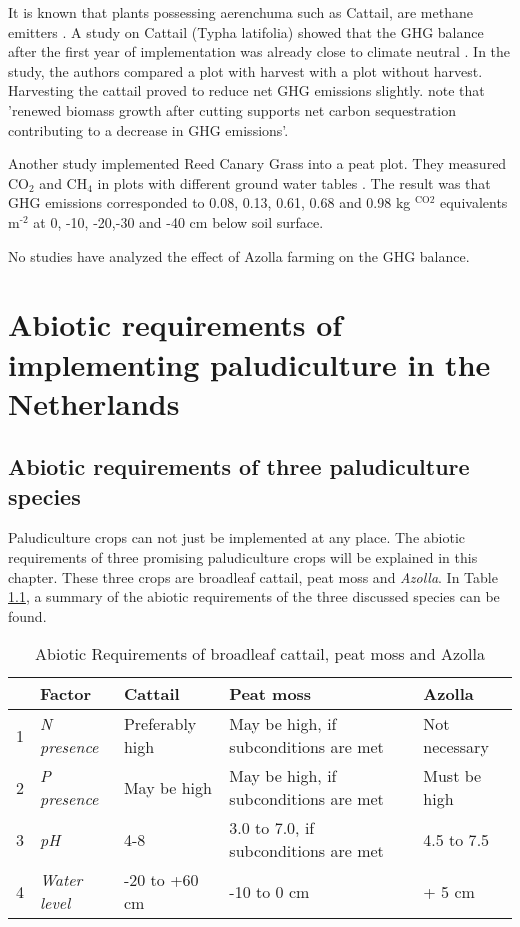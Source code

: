 \documentclass[a4paper,12pt]{scrbook}
\newcommand{\sur}[1]{\ensuremath{^{\textrm{#1}}}}
\newcommand{\sous}[1]{\ensuremath{_{\textrm{#1}}}}
\begin{document}
It is known that plants possessing aerenchuma such as Cattail, are methane emitters \citep{wichtmann2016paludiculture}. A study on Cattail (Typha latifolia) showed that the GHG balance after the first year of implementation was already close to climate neutral \citep{guntherghgtypha}. In the study, the authors compared a plot with harvest with a plot without harvest. Harvesting the cattail proved to reduce net GHG emissions slightly. \citet{wichtmann2016paludiculture} note that 'renewed biomass growth after cutting supports net carbon sequestration contributing to a decrease in GHG emissions'. 

Another study implemented Reed Canary Grass into a peat plot. They measured CO\sous{2} and CH\sous{4} in plots with different ground water tables \citep{Karki2014}. The result was that GHG emissions corresponded to 0.08, 0.13, 0.61, 0.68 and 0.98 kg \sur{CO2} equivalents m\sur{-2} at 0, -10, -20,-30 and -40 cm below soil surface.

No studies have analyzed the effect of Azolla farming on the GHG balance. 


\chapter{Abiotic requirements of implementing paludiculture in the Netherlands}

\section{Abiotic requirements of three paludiculture species}

Paludiculture crops can not just be implemented at any place. The abiotic requirements of three promising paludiculture crops will be explained in this chapter. These three crops are broadleaf cattail, peat moss and \textit{Azolla}. In Table \ref{tab:phy}, a summary of the abiotic requirements of the three discussed species can be found. 

\begin{table}[htbp]
\caption{Abiotic Requirements of broadleaf cattail, peat moss and Azolla}
\begin{flushleft}
\begin{tabular}{|r|l|l|l|l|}
\hline
\multicolumn{1}{|l|}{} & \textbf{Factor} & \textbf{Cattail} & \textbf{Peat moss} & \textbf{Azolla} \\ \hline
1 & \textit{N presence} & Preferably high & May be high, if subconditions are met & Not necessary \\ \hline
2 & \textit{P presence} & May be high & May be high, if subconditions are met & Must be high \\ \hline
3 & \textit{pH} & 4-8 & 3.0 to 7.0, if subconditions are met & 4.5 to 7.5 \\ \hline
4 & \textit{Water level} & -20 to +60 cm & -10 to 0 cm & + 5 cm \\ \hline
\end{tabular}
\end{flushleft}
\label{tab:phy}
\end{table}
\end{document}
